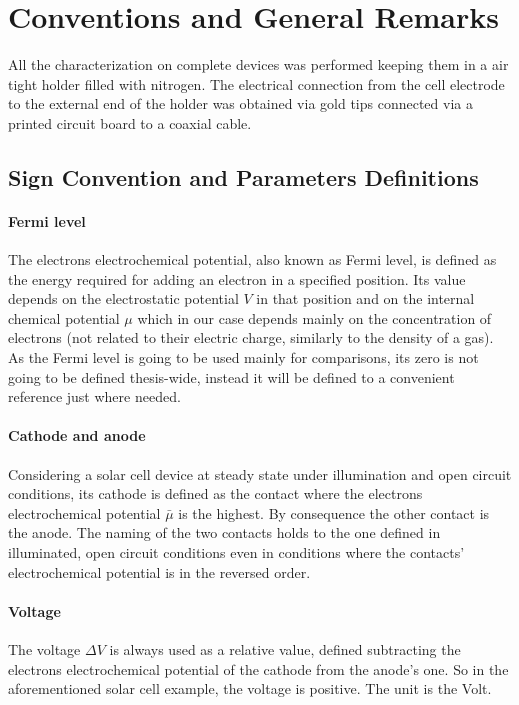 \section{Conventions and General Remarks}

All the characterization on complete devices was performed keeping them in a air tight holder filled with nitrogen. The electrical connection from the cell electrode to the external end of the holder was obtained via gold tips connected via a printed circuit board to a coaxial cable.

\subsection{Sign Convention and Parameters Definitions}

\paragraph{Fermi level} The electrons electrochemical potential, also known as Fermi level, is defined as the energy required for adding an electron in a specified position. Its value depends on the electrostatic potential $V$ in that position and on the internal chemical potential $\mu$ which in our case depends mainly on the concentration of electrons (not related to their electric charge, similarly to the density of a gas). As the Fermi level is going to be used mainly for comparisons, its zero is not going to be defined thesis-wide, instead it will be defined to a convenient reference just where needed.

\paragraph{Cathode and anode} Considering a solar cell device at steady state under illumination and open circuit conditions, its cathode is defined as the contact where the electrons electrochemical potential $\bar\mu$  is the highest. By consequence the other contact is the anode. The naming of the two contacts holds to the one defined in illuminated, open circuit conditions even in conditions where the contacts' electrochemical potential is in the reversed order.

\paragraph{Voltage} The voltage $\Delta V$ is always used as a relative value, defined subtracting the electrons electrochemical potential of the cathode from the anode's one. So in the aforementioned solar cell example, the voltage is positive. The unit is the Volt.

